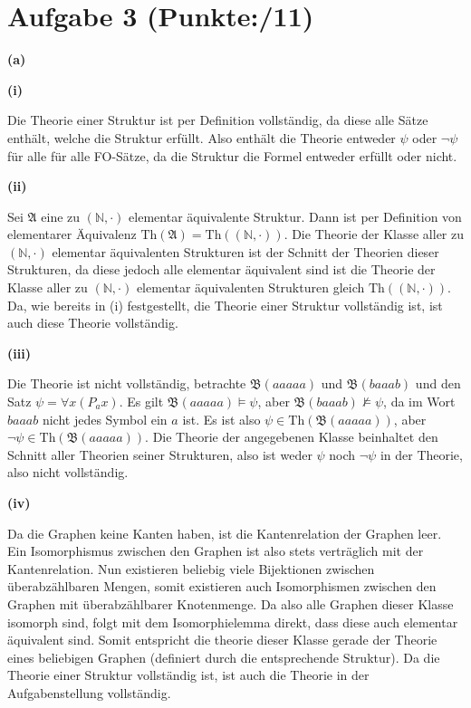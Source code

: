 \documentclass[11pt, a4paper]{article}
\newcommand{\pp}{11}
\newcommand{\struc}[1]{\ensuremath{\mathfrak{#1}}}
\begin{document}
\section*{Aufgabe 3 (Punkte:\qquad/\pp)}
\textbf{(a)}
\begin{adjustwidth}{20pt}{20pt}
\textbf{(i)}
\begin{adjustwidth}{2em}{0em}\vspace{-\baselineskip}
	Die Theorie einer Struktur ist per Definition vollständig, da diese alle Sätze enthält, welche die Struktur erfüllt. Also enthält die Theorie entweder $\psi$ oder $\neg\psi$ für alle
	für alle FO-Sätze, da die Struktur die Formel entweder erfüllt oder nicht.
\end{adjustwidth}
\textbf{(ii)}
\begin{adjustwidth}{2em}{0em}\vspace{-\baselineskip}
	Sei \struc{A} eine zu $(\mathbb{N},\cdot)$ elementar äquivalente Struktur. Dann ist per Definition von elementarer Äquivalenz $\text{Th}(\struc{A})=\text{Th}((\mathbb{N},\cdot))$. Die
	Theorie der Klasse aller zu $(\mathbb{N},\cdot)$ elementar äquivalenten Strukturen ist der Schnitt der Theorien dieser Strukturen, da diese jedoch alle elementar äquivalent sind ist
	die Theorie der Klasse aller zu $(\mathbb{N},\cdot)$ elementar äquivalenten Strukturen gleich $\text{Th}((\mathbb{N},\cdot))$. Da, wie bereits in (i) festgestellt, die Theorie einer
	Struktur vollständig ist, ist auch diese Theorie vollständig.
\end{adjustwidth}
\textbf{(iii)}
\begin{adjustwidth}{2em}{0em}\vspace{-\baselineskip}
	Die Theorie ist nicht vollständig, betrachte $\struc{B}(aaaaa)$ und $\struc{B}(baaab)$ und den Satz $\psi = \forall x(P_ax)$. Es gilt $\struc{B}(aaaaa) \models \psi$, aber 
	$\struc{B}(baaab) \not\models \psi$, da im Wort $baaab$ nicht jedes Symbol ein $a$ ist. Es ist also $\psi \in \text{Th}(\struc{B}(aaaaa))$, aber $\neg\psi \in \text{Th}(\struc{B}(aaaaa))$.
	Die Theorie der angegebenen Klasse beinhaltet den Schnitt aller Theorien seiner Strukturen, also ist weder $\psi$ noch $\neg\psi$ in der Theorie, also nicht vollständig.
\end{adjustwidth}
\textbf{(iv)}
\begin{adjustwidth}{2em}{0em}\vspace{-\baselineskip}
Da die Graphen keine Kanten haben, ist die Kantenrelation der Graphen leer. Ein Isomorphismus zwischen den Graphen ist also stets verträglich mit der Kantenrelation. Nun existieren beliebig viele
Bijektionen zwischen überabzählbaren Mengen, somit existieren auch Isomorphismen zwischen den Graphen mit überabzählbarer Knotenmenge. Da also alle Graphen dieser Klasse isomorph sind, folgt
mit dem Isomorphielemma direkt, dass diese auch elementar äquivalent sind. Somit entspricht die theorie dieser Klasse gerade der Theorie eines beliebigen Graphen (definiert durch die
entsprechende Struktur). Da die Theorie einer Struktur vollständig ist, ist auch die Theorie in der Aufgabenstellung vollständig. 
\end{adjustwidth}
\end{adjustwidth}
\end{document}
